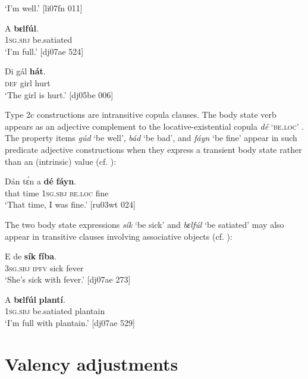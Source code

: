 \glt ‘I’m well.’ [li07fn 011]
\z


\ea%
    \label{ex:key:1265}
    \gll A    \textbf{bɛlfúl}.\\
\textsc{1sg.sbj}  be.satiated\\

\glt ‘I’m full.’ [dj07ae 524]
\z


\ea%
    \label{ex:key:1266}
    \gll Di  gál  \textbf{hát}.\\
\textsc{def}  girl  hurt\\

\glt ‘The girl is hurt.’ [dj05be 006]
\z

Type 2c constructions are intransitive copula clauses. The body state verb appears as an adjective complement to the locative-existential copula \textit{dé} \textsc{‘be.loc’} . The property items \textit{gúd} ‘be well’, \textit{bád} ‘be bad’, and \textit{fáyn} ‘be fine’ appear in such predicate adjective constructions when they express a transient body state rather than an (intrinsic) value (cf. ):


\ea%
    \label{ex:key:1267}
    \gll Dán    tɛ́n    a    \textbf{dé}    \textbf{fáyn}.\\
that    time    \textsc{1sg.sbj}  \textsc{be.loc}  fine\\
\glt ‘That time, I was fine.’   [ru03wt 024]
\z

The two body state expressions \textit{sík} ‘be sick’ and \textit{bɛlfúl} ‘be satiated’ may also appear in transitive clauses involving associative objects (cf. ):


\ea%
    \label{ex:key:1268}
    \gll E    de  \textbf{sík}  \textbf{fíba}.\\
\textsc{3sg.sbj}  \textsc{ipfv}  sick  fever\\

\glt ‘She’s sick with fever.’ [dj07ae 273]
\z


\ea%
    \label{ex:key:1269}
    \gll A    \textbf{bɛlfúl}    \textbf{plantí}.\\
\textsc{1sg.sbj}  be.satiated  plantain\\

\glt ‘I’m full with plantain.’ [dj07ae 529]
\z

\section{Valency adjustments}\label{sec:9.4}

